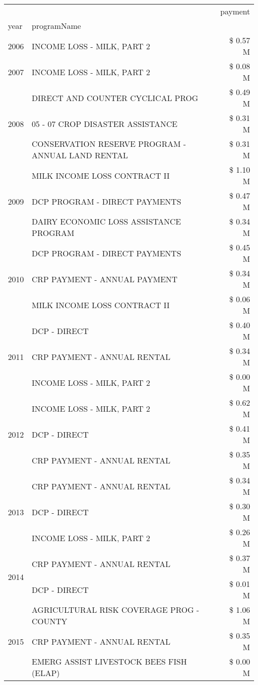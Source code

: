 \begin{tabular}{llr}
\toprule
 &  & payment \\
year & programName &  \\
\midrule
2006 & INCOME LOSS - MILK, PART 2 & \$ 0.57 M \\
\cline{1-3}
2007 & INCOME LOSS - MILK, PART 2 & \$ 0.08 M \\
\cline{1-3}
\multirow[t]{3}{*}{2008} & DIRECT AND COUNTER CYCLICAL PROG & \$ 0.49 M \\
 & 05 - 07 CROP DISASTER ASSISTANCE & \$ 0.31 M \\
 & CONSERVATION RESERVE PROGRAM - ANNUAL LAND RENTAL & \$ 0.31 M \\
\cline{1-3}
\multirow[t]{3}{*}{2009} & MILK INCOME LOSS CONTRACT II & \$ 1.10 M \\
 & DCP PROGRAM - DIRECT PAYMENTS & \$ 0.47 M \\
 & DAIRY ECONOMIC LOSS ASSISTANCE PROGRAM & \$ 0.34 M \\
\cline{1-3}
\multirow[t]{3}{*}{2010} & DCP PROGRAM - DIRECT PAYMENTS & \$ 0.45 M \\
 & CRP PAYMENT - ANNUAL PAYMENT & \$ 0.34 M \\
 & MILK INCOME LOSS CONTRACT II & \$ 0.06 M \\
\cline{1-3}
\multirow[t]{3}{*}{2011} & DCP - DIRECT & \$ 0.40 M \\
 & CRP PAYMENT - ANNUAL RENTAL & \$ 0.34 M \\
 & INCOME LOSS - MILK, PART 2 & \$ 0.00 M \\
\cline{1-3}
\multirow[t]{3}{*}{2012} & INCOME LOSS - MILK, PART 2 & \$ 0.62 M \\
 & DCP - DIRECT & \$ 0.41 M \\
 & CRP PAYMENT - ANNUAL RENTAL & \$ 0.35 M \\
\cline{1-3}
\multirow[t]{3}{*}{2013} & CRP PAYMENT - ANNUAL RENTAL & \$ 0.34 M \\
 & DCP - DIRECT & \$ 0.30 M \\
 & INCOME LOSS - MILK, PART 2 & \$ 0.26 M \\
\cline{1-3}
\multirow[t]{2}{*}{2014} & CRP PAYMENT - ANNUAL RENTAL & \$ 0.37 M \\
 & DCP - DIRECT & \$ 0.01 M \\
\cline{1-3}
\multirow[t]{3}{*}{2015} & AGRICULTURAL RISK COVERAGE PROG - COUNTY & \$ 1.06 M \\
 & CRP PAYMENT - ANNUAL RENTAL & \$ 0.35 M \\
 & EMERG ASSIST LIVESTOCK BEES FISH (ELAP) & \$ 0.00 M \\

\end{tabular}
